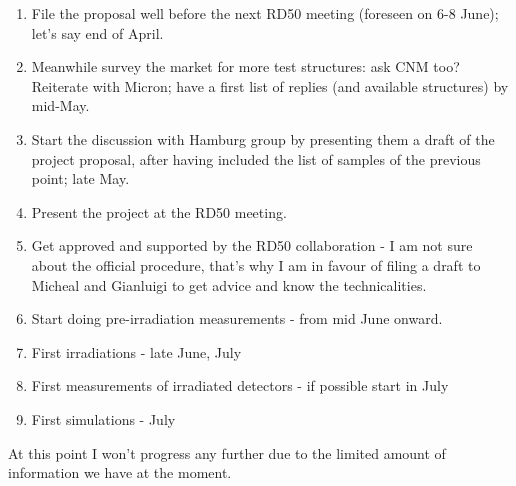 \documentclass[dvips,12pt]{article}
\begin{document}
\begin{enumerate}[1)]
\item File the proposal well before the next RD50 meeting (foreseen on 6-8 June); let's say end of 
April.
\item Meanwhile survey the market for more test structures: ask CNM too? Reiterate with Micron; 
have a first list of replies (and available structures) by mid-May.
\item Start the discussion with Hamburg group by presenting them a draft of the project proposal, 
after having included the list of samples of the previous point; late May.
\item Present the project at the RD50 meeting.
\item Get approved and supported by the RD50 collaboration - I am not sure about the official 
procedure, that's why I am in favour of filing a draft to Micheal and Gianluigi to get advice and know 
the technicalities.
\item Start doing pre-irradiation measurements - from mid June onward.
\item First irradiations - late June, July
\item First measurements of irradiated detectors - if possible start in July
\item First simulations - July
\end{enumerate}
At this point I won't progress any further due to the limited amount of information we have at the 
moment.



\end{document}
